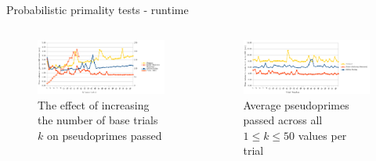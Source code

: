 \documentclass[pdf,aspectratio=169]{beamer}
\begin{document}
\begin{frame}{Probabilistic primality tests - runtime}
    \begin{columns}[t, onlytextwidth]
        \begin{column}{0.48\textwidth}
            \begin{figure}
                \setcounter{figure}{2}
                \caption{The effect of increasing the number of base trials $k$ on pseudoprimes passed}
                \centering
                \includegraphics[width=\textwidth]{time_v_bases}
            \end{figure}
        \end{column}
        \begin{column}{0.48\textwidth}
            \begin{figure}
                \setcounter{figure}{3}
                \caption{Average pseudoprimes passed across all $1 \leq k \leq 50$ values per trial}
                \centering
                \includegraphics[width=\textwidth]{time_v_trial}
            \end{figure}
        \end{column}
    \end{columns}
    \begin{outline}
    \end{outline}
\end{frame}
\end{document}
